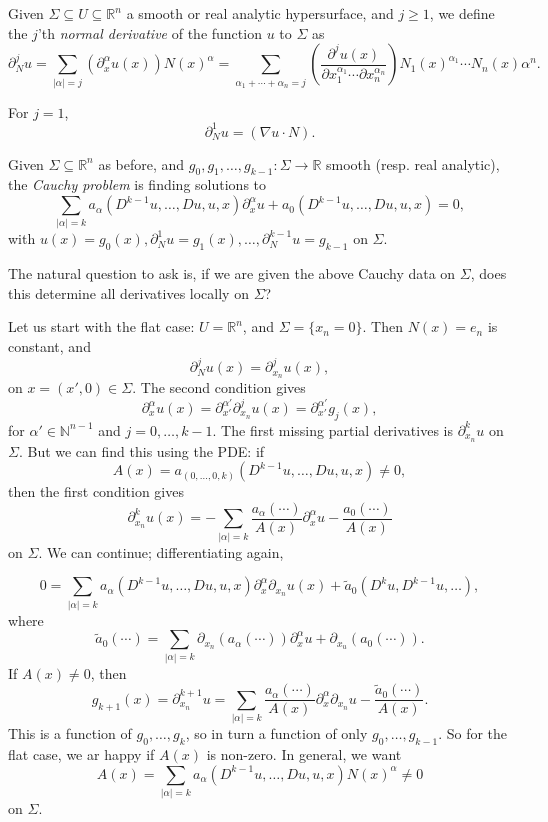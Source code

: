 \documentclass[12pt]{article}
\begin{document}
\begin{definition}
	Given $\Sigma \subseteq U \subseteq \mathbb{R}^n$ a smooth or real analytic hypersurface, and $j \geq 1$, we define the $j$'th \emph{normal derivative} of the function $u$ to $\Sigma$ as
	\[
	\partial^j_N u = \sum_{|\alpha| = j} (\partial^\alpha_x u(x)) N(x)^\alpha = \sum_{\alpha_1 + \cdots + \alpha_n = j} \left( \frac{\partial^j u(x)}{\partial x_1^{\alpha_1} \cdots \partial x_n^{\alpha_n}}\right) N_1(x)^{\alpha_1} \cdots N_n(x) \alpha^{n}.
	\]
\end{definition}

\begin{remark}
	For $j = 1$,
	\[
	\partial^1_N u = (\nabla u \cdot N).
	\]
\end{remark}

\begin{definition}
	Given $\Sigma \subseteq  \mathbb{R}^n$ as before, and $g_0, g_1, \ldots, g_{k-1} : \Sigma \to \mathbb{R}$ smooth (resp. real analytic), the \emph{Cauchy problem} is finding solutions to
	\[
	\sum_{|\alpha| = k} a_\alpha (D^{k-1} u, \ldots, Du, u, x) \partial^\alpha_x u + a_0(D^{k-1}u, \ldots, Du, u, x) = 0,
	\]
	with $u(x) = g_0(x), \partial^1_N u = g_1(x), \ldots, \partial^{k-1}_N u = g_{k-1}$ on $\Sigma$.
\end{definition}

The natural question to ask is, if we are given the above Cauchy data on $\Sigma$, does this determine all derivatives locally on $\Sigma$?

Let us start with the flat case: $U = \mathbb{R}^n$, and $\Sigma = \{x_n = 0\}$. Then $N(x) = e_n$ is constant, and
\[
\partial^j_N u(x) = \partial^j_{x_n} u(x),
\]
on $x = (x', 0) \in \Sigma$. The second condition gives
\[
\partial^{\alpha}_x u(x) = \partial^{\alpha'}_{x'} \partial^j_{x_n} u(x) = \partial^{\alpha'}_{x'} g_j(x),
\]
for $\alpha' \in \mathbb{N}^{n-1}$ and $j = 0, \ldots, k-1$. The first missing partial derivatives is $\partial^{k}_{x_n} u$ on $\Sigma$. But we can find this using the PDE: if
\[
A(x) = a_{(0, \ldots, 0, k)}(D^{k-1}u, \ldots, Du, u, x) \neq 0,
\]
then the first condition gives
\[
\partial^k_{x_n} u(x) = - \sum_{|\alpha| = k} \frac{a_\alpha(\cdots)}{A(x)} \partial^\alpha_x u - \frac{a_0(\cdots)}{A(x)}
\]
on $\Sigma$. We can continue; differentiating again,

\[
0 = \sum_{|\alpha| = k} a_\alpha(D^{k-1} u, \ldots, Du, u, x) \partial^\alpha_x \partial_{x_n} u(x) + \tilde a_0 (D^k u, D^{k-1} u, \ldots),
\]
where
\[
\tilde a_0 (\cdots) = \sum_{|\alpha| = k} \partial_{x_n} (a_\alpha(\cdots)) \partial^\alpha_x u + \partial_{x_u}(a_0(\cdots)).
\]
If $A(x) \neq 0$, then
\[
g_{k+1}(x) = \partial^{k+1}_{x_n} u = \sum_{|\alpha| = k} \frac{a_\alpha(\cdots)}{A(x)} \partial^\alpha_x \partial_{x_n} u - \frac{\tilde a_0(\cdots)}{A(x)}.
\]
This is a function of $g_0, \ldots, g_k$, so in turn a function of only $g_0, \ldots, g_{k-1}$. So for the flat case, we ar happy if $A(x)$ is non-zero. In general, we want
\[
A(x) = \sum_{|\alpha| = k} a_\alpha (D^{k-1} u, \ldots, Du, u, x) N(x)^\alpha \neq 0
\]
on $\Sigma$.
\end{document}
